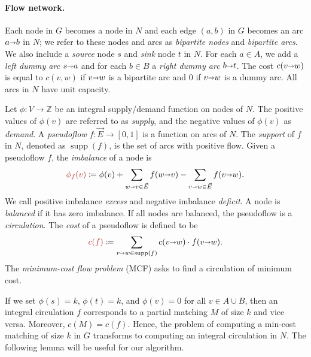 \documentclass[11pt]{article}
\def\ints{\mathbb{Z}}
\def\Set#1{\left\{ #1 \right\}}
\def\fsupply{\phi}
\def\arcto{\mathord\shortrightarrow}
\def\arc#1#2{#1\arcto#2}
\def\cost{c}
\def\supp{\operatorname{supp}}
\numberwithin{figure}{section}
\def\EMPH#1{\textcolor{BrickRed}{{\emph{#1}}}}
\begin{document}
\paragraph*{Flow network.}
Each node in $G$ becomes a node in $N$ and each edge
$(a, b)$ in $G$ becomes an arc $\arc{a}{b}$ in $N$;
we refer to these nodes and arcs as \EMPH{bipartite nodes} and \EMPH{bipartite arcs}.
We also include a \EMPH{source} node $s$ and \EMPH{sink} node $t$ in $N$.
For each $a \in A$, we add a \EMPH{left dummy arc} $\arc{s}{a}$ and for each
$b \in B$ a \EMPH{right dummy arc} $\arc{b}{t}$.
The cost \EMPH{$c(\arc{v}{w})$}
is equal to $c(v, w)$ if
$\arc{v}{w}$ is a bipartite arc and $0$ if $\arc{v}{w}$ is a dummy arc.
All arcs in $N$ have unit capacity.

Let $\fsupply: V \to \ints$ be an integral supply/demand function on nodes of $N$.
The positive values of $\fsupply(v)$ are referred to as \EMPH{supply}, and the
negative values of $\fsupply(v)$ as \EMPH{demand}.
A \EMPH{pseudoflow} $f: \vec{E} \to [0, 1]$ is a function on arcs of $N$.
The \EMPH{support} of $f$ in $N$, denoted as \EMPH{$\supp(f)$}, is the set of arcs with positive flow.
Given a pseudoflow $f$, the \EMPH{imbalance} of a node is
\[
\EMPH{$\fsupply_f (v)$} \coloneqq \fsupply(v) + \sum_{\arc wv \in \vec{E}}{f(\arc wv)} - \sum_{\arc vw \in \vec{E}}{f(\arc vw)}.
\]
We call positive imbalance \EMPH{excess} and negative imbalance \EMPH{deficit}.
A node is \EMPH{balanced} if it has zero imbalance.
If all nodes are balanced, the pseudoflow is a \EMPH{circulation}.
The \EMPH{cost} of a pseudoflow is defined to be
\[
 \EMPH{$\cost(f)$} \coloneqq \sum_{\arc vw \in \supp(f)} c(\arc vw) \cdot f(\arc vw).
\]
The \EMPH{minimum-cost flow problem} (MCF) asks to find a circulation of minimum cost.

If we set $\fsupply(s) = k$, $\fsupply(t) = k$, and $\fsupply(v) = 0$ for all
$v \in A \cup B$, then an integral circulation $f$ corresponds to a partial
matching $M$ of size $k$ and vice versa.
Moreover, $\cost(M) = \cost(f)$.
%
Hence, the problem of computing a min-cost matching of size $k$ in $G$
transforms to computing an integral circulation in $N$.
The following lemma will be useful for our algorithm.
\end{document}
